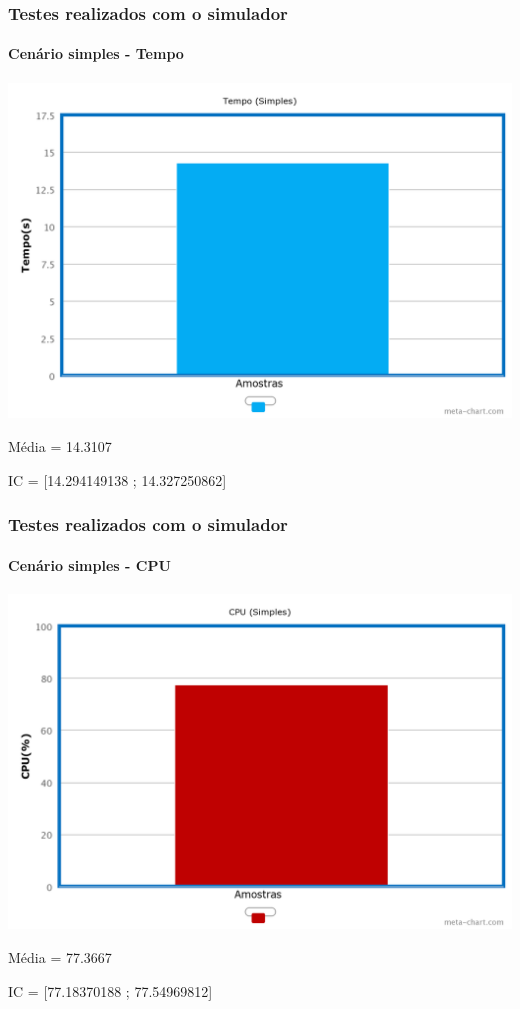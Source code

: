 \documentclass{beamer}
\begin{document}
\begin{frame}
	\frametitle{Testes realizados com o simulador}
	\framesubtitle{Cenário simples - Tempo}
	\begin{center}
	\includegraphics[scale=0.18]{chart.png}
	\end{center}
	\begin{center}
	Média = 14.3107
	\end{center}
	\begin{center}
	IC = [14.294149138 ; 14.327250862]
	\end{center}
\end{frame}

\begin{frame}
	\frametitle{Testes realizados com o simulador}
	\framesubtitle{Cenário simples - CPU}
	\begin{center}
	\includegraphics[scale=0.18]{chart(1).png}
	\end{center}
	\begin{center}
	Média = 77.3667
	\end{center}
	\begin{center}
	IC = [77.18370188 ; 77.54969812]
	\end{center}
\end{frame}
\end{document}
